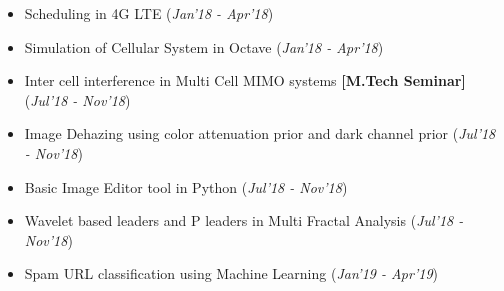 \documentclass[10pt]{article}
\begin{document}
\colorbox{bl}{}
\vspace{-0.5cm}
\begin{itemize}[leftmargin=0.4cm]


	
\item {Scheduling in 4G LTE }
\hfill{(\textit{Jan'18 - Apr'18})}\\
\vspace{-0.7cm}
	
	
\item {Simulation of Cellular System in Octave}
\hfill{(\textit{Jan'18 - Apr'18})}\\
\vspace{-0.7cm}

\item {Inter cell interference in Multi Cell MIMO systems 
} \textbf{[M.Tech Seminar]}
\hfill{(\textit{Jul'18 - Nov'18})}\\
\vspace{-0.7cm}

\item {Image Dehazing using color attenuation prior and dark channel prior 
} \hfill{(\textit{Jul'18 - Nov'18})}\\
\vspace{-0.7cm}

\item {Basic Image Editor tool in Python 
} 
\hfill{(\textit{Jul'18 - Nov'18})}\\
\vspace{-0.7cm}

\item {Wavelet based leaders and P leaders in Multi
Fractal Analysis} 
\hfill{(\textit{Jul'18 - Nov'18})}\\
\vspace{-0.7cm}

\item {Spam URL classification using Machine Learning}
\hfill{(\textit{Jan'19 - Apr'19})}\\
\vspace{-0.5cm}



\end{itemize}
\end{document}
